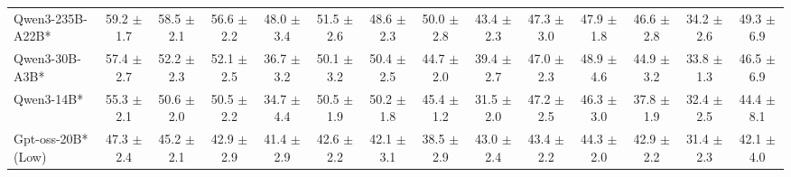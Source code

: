 \begin{table}[hbt]
{\begin{tabular}{l *{13}{c}}
Qwen3-235B-A22B* &
59.2 {\tiny$\pm$ 1.7} &
58.5 {\tiny$\pm$ 2.1} &
56.6 {\tiny$\pm$ 2.2} &
48.0 {\tiny$\pm$ 3.4} &
51.5 {\tiny$\pm$ 2.6} &
48.6 {\tiny$\pm$ 2.3} &
50.0 {\tiny$\pm$ 2.8} &
43.4 {\tiny$\pm$ 2.3} &
47.3 {\tiny$\pm$ 3.0} &
47.9 {\tiny$\pm$ 1.8} &
46.6 {\tiny$\pm$ 2.8} &
34.2 {\tiny$\pm$ 2.6} &
49.3 {\tiny$\pm$ 6.9} \\
 
\rowcolor{gray!10}
Qwen3-30B-A3B* &
57.4 {\tiny$\pm$ 2.7} &
52.2 {\tiny$\pm$ 2.3} &
52.1 {\tiny$\pm$ 2.5} &
36.7 {\tiny$\pm$ 3.2} &
50.1 {\tiny$\pm$ 3.2} &
50.4 {\tiny$\pm$ 2.5} &
44.7 {\tiny$\pm$ 2.0} &
39.4 {\tiny$\pm$ 2.7} &
47.0 {\tiny$\pm$ 2.3} &
48.9 {\tiny$\pm$ 4.6} &
44.9 {\tiny$\pm$ 3.2} &
33.8 {\tiny$\pm$ 1.3} &
46.5 {\tiny$\pm$ 6.9} \\

 

Qwen3-14B* &
55.3 {\tiny$\pm$ 2.1} &
50.6 {\tiny$\pm$ 2.0} &
50.5 {\tiny$\pm$ 2.2} &
34.7 {\tiny$\pm$ 4.4} &
50.5 {\tiny$\pm$ 1.9} &
50.2 {\tiny$\pm$ 1.8} &
45.4 {\tiny$\pm$ 1.2} &
31.5 {\tiny$\pm$ 2.0} &
47.2 {\tiny$\pm$ 2.5} &
46.3 {\tiny$\pm$ 3.0} &
37.8 {\tiny$\pm$ 1.9} &
32.4 {\tiny$\pm$ 2.5} &
44.4 {\tiny$\pm$ 8.1} \\

\rowcolor{gray!10}
Gpt-oss-20B* (Low)&
47.3 {\tiny$\pm$ 2.4}&	
45.2 {\tiny$\pm$ 2.1}&	
42.9 {\tiny$\pm$ 2.9}&	
41.4 {\tiny$\pm$ 2.9}&	
42.6 {\tiny$\pm$ 2.2}&	
42.1 {\tiny$\pm$ 3.1}&	
38.5 {\tiny$\pm$ 2.9}&
43.0 {\tiny$\pm$ 2.4}&	
43.4 {\tiny$\pm$ 2.2}&	
44.3 {\tiny$\pm$ 2.0}&	
42.9 {\tiny$\pm$ 2.2}&	
31.4 {\tiny$\pm$ 2.3}&	
42.1 {\tiny$\pm$ 4.0}\\	




\end{tabular}}
\end{table}
